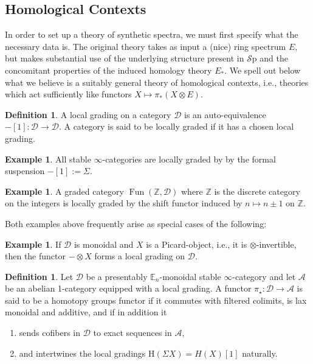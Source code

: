 \documentclass[10pt]{amsart}
\theoremstyle{definition}
\numberwithin{figure}{section}
\numberwithin{equation}{section}
\newtheorem{definition}[figure]{Definition}
\newtheorem{example}[figure]{Example}
\newcommand{\cA}{\mathcal{A}}
\newcommand{\cD}{\mathcal{D}}
\theoremstyle{cited}
\newcommand{\bZ}{\mathbb{Z}}
\newcommand{\bE}{\mathbb{E}}
\newcommand{\Fun}{\operatorname{Fun}}
\newcommand{\Sp}{{\mathcal{S}\mathrm{p}}}
\renewcommand{\H}{\mathrm{H}}
\begin{document}
\subsection{Homological Contexts} In order to set up a theory of synthetic spectra, we must first specify what the necessary data is. The original theory takes as input a (nice) ring spectrum $E$, but makes substantial use of the underlying structure present in $\Sp$ and the concomitant properties of the induced homology theory $E_*$. We spell out below what we believe is a suitably general theory of homological contexts, i.e., theories which act sufficiently like functors $X\mapsto \pi_*(X\otimes E)$.


\begin{definition}
  A local grading on a category $\cD$ is an auto-equivalence $-[1]:\cD\to \cD$. A category is said to be locally graded if it has a chosen local grading.
\end{definition}

\begin{example}
  All stable $\infty$-categories are locally graded by by the formal suspension $-[1]:=\Sigma$. 
\end{example}

\begin{example}
  A graded category $\Fun(\bZ,\cD)$ where $\bZ$ is the discrete category on the integers is locally graded by the shift functor induced by $n\mapsto n\pm 1$ on $\bZ$.
\end{example}

Both examples above frequently arise as special cases of the following:

\begin{example}
  If $\cD$ is monoidal and $X$ is a Picard-object, i.e., it is $\otimes$-invertible, then the functor $-\otimes X$ forms a local grading on $\cD$.
\end{example}

\begin{definition}
  Let $\cD$ be a presentably $\bE_n$-monoidal stable $\infty$-category and let $\cA$ be an abelian 1-category equipped with a local grading. A functor $\pi_\star:\cD\to \cA$ is said to be a homotopy groups functor if it commutes with filtered colimits, is lax monoidal and additive, and if in addition it
  \begin{enumerate}
    \item sends cofibers in $\cD$ to exact sequences in $\cA$,
    \item and intertwines the local gradings $\H(\Sigma X)=H(X)[1]$ naturally.
  \end{enumerate}
\end{definition}
\end{document}
